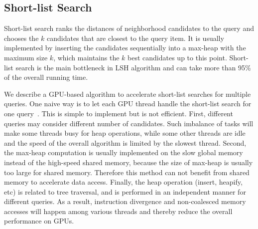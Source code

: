 \subsection{Short-list Search}
\label{sec:6:gpu:slsearch}
Short-list search ranks the distances of neighborhood candidates to the query and chooses the $k$ candidates that are closest to the query item. It is usually implemented by inserting the candidates sequentially into a max-heap with the maximum size $k$, which maintains the $k$ best candidates up to this point. Short-list search is the main bottleneck in LSH algorithm and can take more than 95\% of the overall running time.

We describe a GPU-based algorithm to accelerate short-list searches for multiple queries. One naive way is to let each GPU thread handle the short-list search for one query~\cite{Pan:IROS:2010}. This is simple to implement but is not efficient. First, different queries may consider different number of candidates. Such imbalance of tasks will make some threads busy for heap operations, while some other threads are idle and the speed of the overall algorithm is limited by the slowest thread. Second, the max-heap computation is usually implemented on the slow global memory instead of the high-speed shared memory, because the size of max-heap is usually too large for shared memory. Therefore this method can not benefit from shared memory to accelerate data access. Finally, the heap operation (insert, heapify, etc) is related to tree traversal, and is performed in an independent manner for different queries. As a result, instruction divergence and non-coalesced memory accesses will happen among various threads and thereby reduce the overall performance on GPUs.

